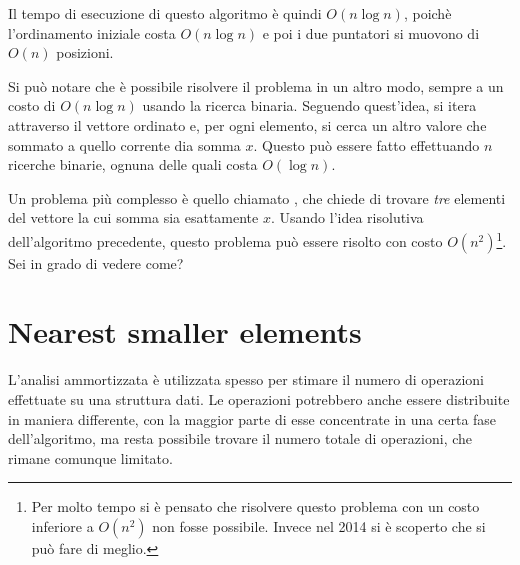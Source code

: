 \begin{center}
\end{center}

Il tempo di esecuzione di questo algoritmo è quindi
$O(n \log n)$, poichè l'ordinamento iniziale costa $O(n \log n)$ e
poi i due puntatori si muovono di $O(n)$ posizioni.

Si può notare che è possibile risolvere il problema in un altro
modo, sempre a un costo di $O(n \log n)$ usando la ricerca binaria.
Seguendo quest'idea, si itera attraverso il vettore ordinato e, per ogni elemento, si cerca
un altro valore che sommato a quello corrente dia somma $x$.
Questo può essere fatto effettuando $n$ ricerche binarie,
ognuna delle quali costa $O(\log n)$.

Un problema più complesso è quello chiamato
, che chiede di trovare \emph{tre} elementi del vettore la 
cui somma sia esattamente $x$.
Usando l'idea risolutiva dell'algoritmo precedente,
questo problema può essere risolto con costo $O(n^2)$\footnote{
Per molto tempo si è pensato che risolvere questo problema
con un costo inferiore a $O(n^2)$ non fosse possibile.
Invece nel 2014 si è scoperto \cite{gro14}
che si può fare di meglio.}. Sei in grado di vedere come?

\section{Nearest smaller elements}
\label{sec:nearest_smaller_elements}


L'analisi ammortizzata è utilizzata spesso per
stimare il numero di operazioni 
effettuate su una struttura dati.
Le operazioni potrebbero anche essere distribuite in maniera differente,
con la maggior parte di esse concentrate in
una certa fase dell'algoritmo,
ma resta possibile trovare il numero totale di operazioni, che
rimane comunque limitato.

